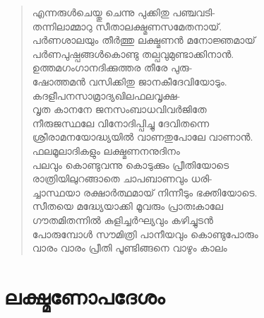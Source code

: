 \begin{verse}
എന്നരുള്‍ചെയ്തു ചെന്നു പുക്കിതു പഞ്ചവടി-\\
തന്നിലാമ്മാറു സീതാലക്ഷ്മണസമേതനായ്.\\
പര്‍ണശാലയും തീര്‍ത്തു ലക്ഷ്മണന്‍ മനോജ്ഞമായ്\\
പര്‍ണപുഷ്പങ്ങള്‍കൊണ്ടു തല്പവുമുണ്ടാക്കിനാന്‍.\\
ഉത്തമഗംഗാനദിക്കുത്തര തീരേ പുരു-\\
ഷോത്തമന്‍ വസിക്കിതു ജാനകീദേവിയോടും.\\
കദളീപനസാമ്രാദ്യഖിലഫലവൃക്ഷ-\\
വൃത കാനനേ ജനസംബാധവിവര്‍ജിതേ\\
നീരുജസ്ഥലേ വിനോദിപ്പിച്ചു ദേവിതന്നെ\\
ശ്രീരാമനയോദ്ധ്യയില്‍ വാണതുപോലേ വാണാന്‍.\\
ഫലമൂലാദികളും ലക്ഷ്മണനനുദിനം\\
പലവും കൊണ്ടുവന്നു കൊടുക്കും പ്രീതിയോടെ\\
രാത്രിയിലുറങ്ങാതെ ചാപബാണവും ധരി-\\
ച്ചാസ്ഥയാ രക്ഷാര്‍ത്ഥമായ് നിന്നീടും ഭക്തിയോടെ.\\
സീതയെ മദ്ധ്യേയാക്കി മൂവരും പ്രാതഃകാലേ\\
ഗൗതമിതന്നില്‍ കുളിച്ചര്‍ഘ്യവും കഴിച്ചുടന്‍\\
പോരുമ്പോള്‍ സൗമിത്രി പാനീയവും കൊണ്ടുപോരും\\
വാരം വാരം പ്രീതി പൂണ്ടിങ്ങനെ വാഴും കാലം
\end{verse}

\section{ലക്ഷ്മണോപദേശം}

